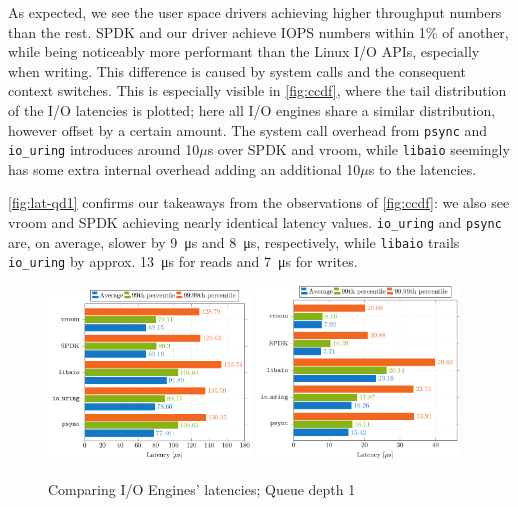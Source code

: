 As expected, we see the user space drivers achieving higher throughput numbers than the rest. SPDK and our driver achieve IOPS numbers within 1\% of another, while being noticeably more performant than the Linux I/O APIs, especially when writing. This difference is caused by system calls and the consequent context switches. This is especially visible in \autoref{fig:ccdf}, where the tail distribution of the I/O latencies is plotted; here all I/O engines share a similar distribution, however offset by a certain amount. The system call overhead from \texttt{psync} and \texttt{io\_uring} introduces around 10$\mu$s over SPDK and vroom, while \texttt{libaio} seemingly has some extra internal overhead adding an additional 10$\mu$s to the latencies.

\autoref{fig:lat-qd1} confirms our takeaways from the observations of \autoref{fig:ccdf}: we also see vroom and SPDK achieving nearly identical latency values. \texttt{io\_uring} and \texttt{psync} are, on average, slower by \qty{9}{\micro\second} and \qty{8}{\micro\second}, respectively, while \texttt{libaio} trails \texttt{io\_uring} by approx. \qty{13}{\micro\second} for reads and \qty{7}{\micro\second} for writes.

\begin{figure}
  \centering
   {\includegraphics[width=0.48\textwidth]{figures/latency-read-xbar} \label{fig:lat-read}}
   {\includegraphics[width=0.48\textwidth]{figures/latency-write-xbar} \label{fig:lat-write}}
  \caption{Comparing I/O Engines' latencies; Queue depth 1}
  \label{fig:lat-qd1}
\end{figure}

